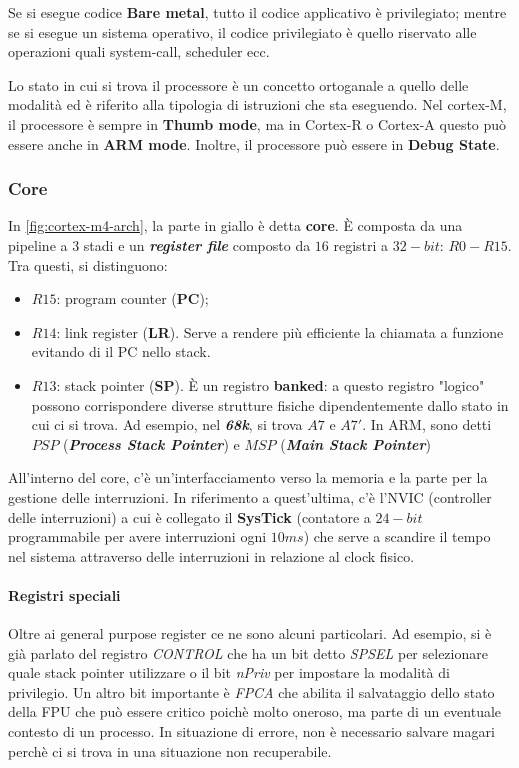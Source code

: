 \documentclass{article}
\begin{document}
Se si esegue codice \textbf{Bare metal}, tutto il codice applicativo è privilegiato; mentre se si esegue un sistema operativo, il codice privilegiato è quello riservato alle operazioni quali system-call, scheduler ecc.

Lo stato in cui si trova il processore è un concetto ortoganale a quello delle modalità ed è riferito alla tipologia di istruzioni che sta eseguendo. Nel cortex-M, il processore è sempre in \textbf{Thumb mode}, ma in Cortex-R o Cortex-A questo può essere anche in \textbf{ARM mode}. Inoltre, il processore può essere in \textbf{Debug State}.


\subsubsection{Core}
In \cref{fig:cortex-m4-arch}, la parte in giallo è detta \textbf{core}. È composta da una pipeline a $3$ stadi e un \textbf{\textit{register file}} composto da $16$ registri a $32-bit$: $R0-R15$. Tra questi, si distinguono:
\begin{itemize}
  \item $R15$: program counter (\textbf{PC});
  \item $R14$: link register (\textbf{LR}). Serve a rendere più efficiente la chiamata a funzione evitando di il PC nello stack.
  \item $R13$: stack pointer (\textbf{SP}). È un registro \textbf{banked}: a questo registro "logico" possono corrispondere diverse strutture fisiche dipendentemente dallo stato in cui ci si trova. Ad esempio, nel \textbf{\textit{68k}}, si trova $A7$ e $A7'$. In ARM, sono detti $PSP$ (\textbf{\textit{Process Stack Pointer}}) e $MSP$ (\textbf{\textit{Main Stack Pointer}})  
\end{itemize}

All'interno del core, c'è un'interfacciamento verso la memoria e la parte per la gestione delle interruzioni. In riferimento a quest'ultima, c'è l'NVIC (controller delle interruzioni) a cui è collegato il \textbf{SysTick} (contatore a $24-bit$ programmabile per avere interruzioni ogni $10ms$) che serve a scandire il tempo nel sistema attraverso delle interruzioni in relazione al clock fisico.

\paragraph{Registri speciali}
Oltre ai general purpose register ce ne sono alcuni particolari. Ad esempio, si è già parlato del registro \textit{CONTROL} che ha un bit detto \textit{SPSEL} per selezionare quale stack pointer utilizzare o il bit \textit{nPriv} per impostare la modalità di privilegio. Un altro bit importante è \textit{FPCA} che abilita il salvataggio dello stato della FPU che può essere critico poichè molto oneroso, ma parte di un eventuale contesto di un processo. In situazione di errore, non è necessario salvare magari perchè ci si trova in una situazione non recuperabile.
\end{document}
